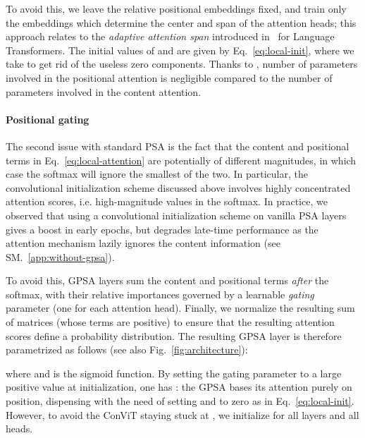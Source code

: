 \documentclass[a4paper,11pt,twocolumn]{article}
\newcommand{\citet}[1]{\textcite{#1}}
\begin{document}
To avoid this, we leave the relative positional embeddings  fixed, and train only the embeddings  which determine the center and span of the attention heads; this approach relates to the \emph{adaptive attention span} introduced in~\citet{sukhbaatar2019adaptive} for Language Transformers. The initial values of  and  are given by Eq.~\ref{eq:local-init}, where we take  to get rid of the useless zero components. Thanks to , number of parameters involved in the positional attention is negligible compared to the number of parameters involved in the content attention.

\paragraph{Positional gating} 
The second issue with standard PSA is the fact that the content and positional terms in Eq.~\ref{eq:local-attention} are potentially of different magnitudes, in which case the softmax will ignore the smallest of the two. In particular, the convolutional initialization scheme discussed above involves highly concentrated attention scores, i.e. high-magnitude values in the softmax. In practice, we observed that using a convolutional initialization scheme on vanilla PSA layers gives a boost in early epochs, but degrades late-time performance as the attention mechanism lazily ignores the content information (see SM.~\ref{app:without-gpsa}). 

To avoid this, GPSA layers sum the content and positional terms \emph{after} the softmax, with their relative importances governed by a learnable \emph{gating} parameter  (one for each attention head). Finally, we normalize the resulting sum of matrices (whose terms are positive) to ensure that the resulting attention scores define a probability distribution. The resulting GPSA layer is therefore parametrized as follows (see also Fig.~\ref{fig:architecture}):

where  and  is the sigmoid function. By setting the gating parameter  to a large positive value at initialization, one has  : the GPSA bases its attention purely on position, dispensing with the need of setting  and  to zero as in Eq.~\ref{eq:local-init}. However, to avoid the ConViT staying stuck at , we initialize  for all layers and all heads.
\end{document}

